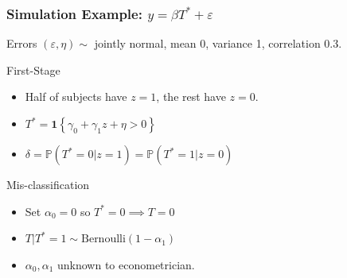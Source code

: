 \documentclass{beamer}
\begin{document}
\begin{frame}
  \frametitle{Simulation Example: $y = \beta T^* + \varepsilon$}
  \begin{block}{Errors}
      $(\varepsilon, \eta) \sim $ jointly normal, mean 0, variance 1, correlation 0.3.
  \end{block}
  \begin{block}{First-Stage}
      \begin{itemize}
        \item Half of subjects have $z=1$, the rest have $z=0$.
        \item $T^* = \mathbf{1}\left\{ \gamma_0 + \gamma_1 z + \eta > 0 \right\}$
        \item $\delta = \mathbb{P}(T^* = 0|z =1) = \mathbb{P}(T^*=1|z=0)$
      \end{itemize}
  \end{block}
  \vspace{-1em}


  \begin{block}{Mis-classification}
      \begin{itemize}
        \item Set $\alpha_0 = 0$ so $T^* = 0 \implies T=0$
        \item $T|T^*=1 \sim \mbox{Bernoulli}(1-\alpha_1)$
        \item $\alpha_0, \alpha_1$ unknown to econometrician.
      \end{itemize}
  \end{block}
  
\end{frame}
\begin{frame}
  \begin{center}
    {}
  \end{center}
\end{frame}
\end{document}
